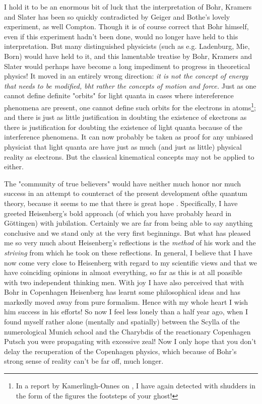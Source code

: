 I hold it to be an enormous bit of luck that the interpretation of Bohr, Kramers and Slater has been so quickly contradicted by Geiger and Bothe's lovely experiment, as well  Compton. Though it is of course correct that Bohr himself, even if this experiment hadn't been done, would no longer have held to this interpretation. But many distinguished physicists (such as e.g. Ladenburg, Mie, Born) would have held to it, and this lamentable treatise by Bohr, Kramers and Slater would perhaps have become a long impediment to progress in theoretical physics! It moved in an entirely wrong direction: \textit{it is not the concept of energy that needs to be modified, bht rather the concepts of motion and force.} Just as one cannot define definite "orbits" for light quanta in cases where intereference phenomena are present, one cannot define such orbits for the electrons in atoms\footnote{In a report by Kamerlingh-Onnes on , I have again detected with shudders in the form of the figures the footsteps of your ghost!}; and there is just as little justification in doubting the existence of ekectrons as there is justification for doubting the existence of light quanta because of the interference phenomena. It can now probably be taken as proof for any unbiased physiciat that light quanta are have just as much (and just as little) physical reality as electrons. But the classical kinematical concepts may not be applied to either.

The "community of true believers" would have neither much honor nor much success in an attempt to counteract  of the present development ofthe quantum theory, because it seems to me that there is great hope . Specifically, I have greeted Heisenberg's bold approach (of which you have probably heard in G\"ottingen) with jubilation. Certainly we are far from being able to say anything conclusive and we stand only at the very first beginnings. But what has pleased me so very much about Heisenberg's reflections is the \textit{method} of his work and the \textit{striving} from which he took on these reflections. In general, I believe that I have now come very close to Heisenberg with regard to my scientific views and that we have coinciding opinions in almoat everything, so far as this is at all poasible with two independent thinking men. With joy I have also perceived that with Bohr in Copenhagen Heisenberg has learnt some philosophical ideas and has markedly moved away from pure formalism. Hence with my whole heart I wish him success in his efforts! So now I feel less lonely than a half year ago, when I found myself rather alone (mentally and spatially) between the Scylla of the numerological Munich school and the Charybdis of the reactionary Copenhagen Putsch you were propagating with excessive zeal! Now I only hope that you don't delay the recuperation of the Copenhagen physics, which because of Bohr's strong sense of reality can't be far off, much longer.

